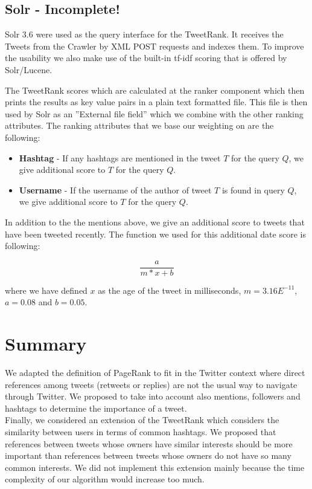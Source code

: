 \documentclass[12pt,a4paper]{article}
\begin{document}
\subsection{Solr - Incomplete!}
Solr 3.6 were used as the query interface for the TweetRank. It receives the Tweets from the Crawler by XML POST requests and indexes them. To improve the usability we also make use of the built-in tf-idf scoring that is offered by Solr/Lucene.

The TweetRank scores which are calculated at the ranker component which then prints the results as key value pairs in a plain text formatted file. This file is then used by Solr as an ''External file field'' which we combine with the other ranking attributes. The ranking attributes that we base our weighting on are the following:

\begin{itemize}
	\item \textbf{Hashtag} - If any hashtags are mentioned in the tweet $T$ for the query $Q$, we give additional score to $T$ for the query $Q$.
	\item \textbf{Username} - If the username of the author of tweet $T$ is found in query $Q$, we give additional score to $T$ for the query $Q$.
\end{itemize}

In addition to the the mentions above, we give an additional score to tweets that have been tweeted recently. The function we used for this additional date score is following: 

\begin{equation}
\frac{a}{m*x+b}
\end{equation}

where we have defined $x$ as the age of the tweet in milliseconds, $m = 3.16E^{-11}$, $a = 0.08$ and $b = 0.05$. 



\section{Summary}
We adapted the definition of PageRank to fit in the Twitter context where direct references among tweets (retweets or replies) are not the usual way to navigate through Twitter. We proposed to take into account also mentions, followers and hashtags to determine the importance of a tweet. \\

Finally, we considered an extension of the TweetRank which considers the similarity between users in terms of common hashtags. We proposed that references between tweets whose owners have similar interests should be more important than references between tweets whose owners do not have so many common interests. We did not implement this extension mainly because the time complexity of our algorithm would increase too much. \\
\end{document}
